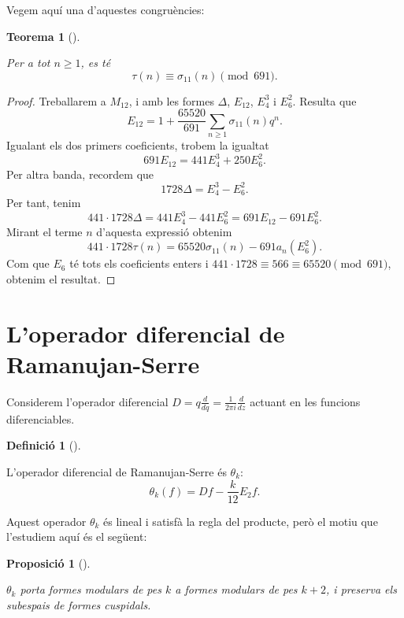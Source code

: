 \documentclass[
  letterpaper,
  DIV=11,
  numbers=noendperiod]{scrreprt}
\theoremstyle{plain}
\newtheorem{theorem}{Teorema}[chapter]
\theoremstyle{plain}
\theoremstyle{definition}
\newtheorem{definition}{Definició}[chapter]
\theoremstyle{plain}
\newtheorem{proposition}{Proposició}[chapter]
\theoremstyle{plain}
\theoremstyle{definition}
\theoremstyle{remark}
\begin{document}
Vegem aquí una d'aquestes congruències:

\begin{theorem}[]\protect\hypertarget{thm-}{}\label{thm-}

Per a tot \(n\geq 1\), es té \[
\tau(n)\equiv \sigma_{11}(n)\pmod{691}.
\]

\end{theorem}

\begin{proof}
Treballarem a \(M_{12}\), i amb les formes \(\Delta\), \(E_{12}\),
\(E_4^3\) i \(E_6^2\). Resulta que \[
E_{12} = 1 + \frac{65520}{691}\sum_{n\geq 1}\sigma_{11}(n)q^n.
\] Igualant els dos primers coeficients, trobem la igualtat \[
691 E_{12} = 441 E_4^3 + 250 E_6^2.
\] Per altra banda, recordem que \[
1728\Delta = E_4^3 - E_6^2.
\] Per tant, tenim \[
441\cdot 1728 \Delta = 441 E_4^3 - 441 E_6^2 = 691 E_{12} - 691 E_6^2.
\] Mirant el terme \(n\) d'aquesta expressió obtenim \[
441\cdot 1728 \tau(n) = 65520 \sigma_{11}(n) - 691 a_n(E_6^2).
\] Com que \(E_6\) té tots els coeficients enters i
\(441\cdot 1728\equiv 566 \equiv 65520\pmod{691}\), obtenim el resultat.
\end{proof}

\section{L'operador diferencial de
Ramanujan-Serre}\label{loperador-diferencial-de-ramanujan-serre}

Considerem l'operador diferencial
\(D=q\frac{d}{dq}=\frac{1}{2\pi i}\frac{d}{dz}\) actuant en les funcions
diferenciables.

\begin{definition}[]\protect\hypertarget{def-theta-ramanujan-serre}{}\label{def-theta-ramanujan-serre}

L'operador diferencial de Ramanujan-Serre és \(\theta_k\): \[
\theta_k(f) = Df - \frac{k}{12}E_2 f.
\]

\end{definition}

Aquest operador \(\theta_k\) és lineal i satisfà la regla del producte,
però el motiu que l'estudiem aquí és el següent:

\begin{proposition}[]\protect\hypertarget{prp-}{}\label{prp-}

\(\theta_k\) porta formes modulars de pes \(k\) a formes modulars de pes
\(k+2\), i preserva els subespais de formes cuspidals.

\end{proposition}
\end{document}
